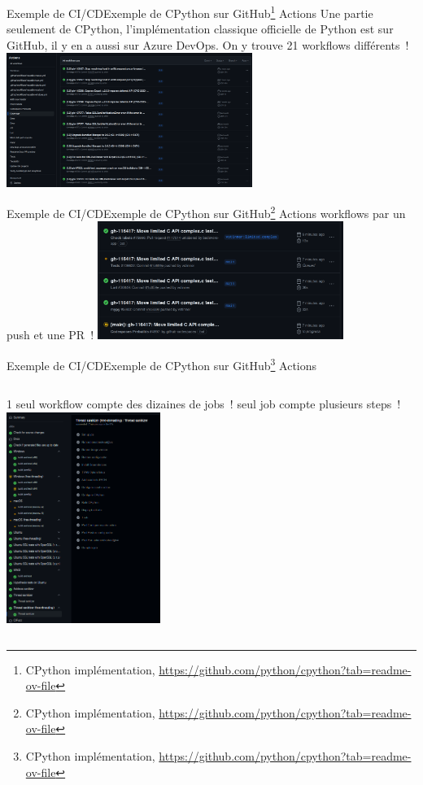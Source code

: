 \documentclass{beamer}
\begin{document}
    \begin{frame}{Exemple de CI/CD}{Exemple de CPython sur GitHub{\footnote{CPython implémentation, \url{https://github.com/python/cpython?tab=readme-ov-file}}} Actions}
        \transdissolve
        Une partie seulement de CPython, l'implémentation classique officielle de Python est sur GitHub, il y en a aussi sur Azure DevOps.
        On y trouve 21 workflows différents~!
        \bigbreak
        \centering
        \includegraphics[width=8cm]{image/cpython-github-workflows}
    \end{frame}

    \begin{frame}{Exemple de CI/CD}{Exemple de CPython sur GitHub{\footnote{CPython implémentation, \url{https://github.com/python/cpython?tab=readme-ov-file}}} Actions}
         workflows  par un push et une PR~!
        \bigbreak
        \centering
        \includegraphics[width=8cm]{image/cpython-actions-triggered}
    \end{frame}

    \begin{frame}{Exemple de CI/CD}{Exemple de CPython sur GitHub{\footnote{CPython implémentation, \url{https://github.com/python/cpython?tab=readme-ov-file}}} Actions}
        \transdissolve
        \begin{columns}
            1 seul workflow compte des dizaines de jobs~!
             seul job compte plusieurs steps~!
            \centering
            \includegraphics[width=5cm]{image/cpython-workflow-jobs}
        \end{columns}
    \end{frame}
\end{document}
